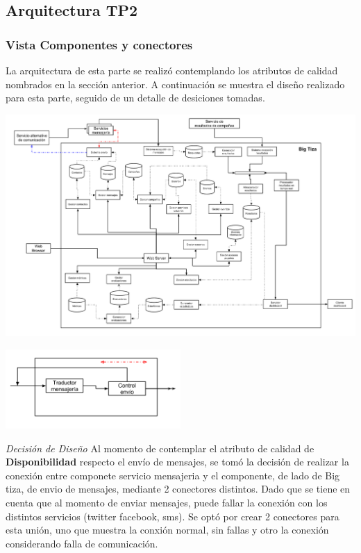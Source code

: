 \documentclass[a4paper, 11pt]{article}
\begin{document}
\subsection{Arquitectura TP2}
\subsubsection{Vista Componentes y conectores}
La arquitectura de esta parte se realizó contemplando los atributos de calidad nombrados en la sección anterior. A continuación se muestra el diseño realizado para esta parte, seguido de un detalle de desiciones tomadas.

\centerline{\includegraphics[width=1.1\textwidth]{./diagramas/VistaCompyCon.png}}
\centerline{\includegraphics[width=0.5\textwidth]{./diagramas/ArqTP2Envio.png}}

\emph{Decisión de Diseño} Al momento de contemplar el atributo de calidad de \textbf{Disponibilidad} respecto el envío de mensajes, se tomó la decisión de realizar la conexión entre componete servicio mensajeria  y el componente, de lado de Big tiza, de envio de mensajes, mediante 2 conectores distintos. Dado que se tiene en cuenta que al momento  de enviar mensajes, puede fallar la conexión con los distintos servicios (twitter facebook, sms). 
Se optó por crear 2 conectores para esta unión, uno que muestra la conxión normal, sin fallas y otro la conexión considerando falla de comunicación.\\
\end{document}
